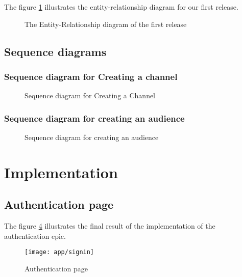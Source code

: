 \noindent The figure \ref{r1-erd}  illustrates the entity-relationship diagram for our first release.

\begin{figure}[hbt!]
    \centering
    
    \caption{The Entity-Relationship diagram of the first release}
    \label{r1-erd}
\end{figure}


\subsection{Sequence diagrams}
\subsubsection{Sequence diagram for Creating a channel}

\begin{landscape}
    \begin{figure}[hbt!]
        \centering
        
        \caption{Sequence diagram for Creating a Channel}
        \label{seq-create-channel}
    \end{figure}
\end{landscape}

\subsubsection{Sequence diagram for creating an audience}

\begin{landscape}
    \begin{figure}[hbt!]
        \centering
        
        \caption{Sequence diagram for creating an audience}
        \label{seq-create-audience}
    \end{figure}
\end{landscape}


\section{Implementation}
\subsection{Authentication page}
The figure \ref{ss-signin} illustrates the final result of the implementation of the authentication epic.
\begin{figure}[hbt!]
    \centering
    \texttt{[image: app/signin]}
    \caption{Authentication page}
    \label{ss-signin}
\end{figure}

